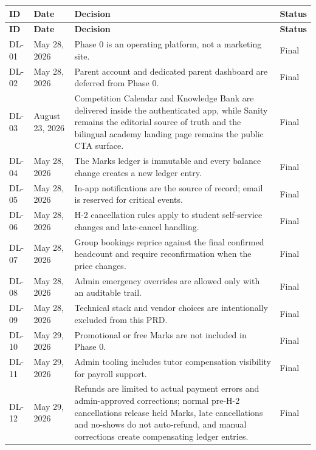\documentclass[11pt,a4paper]{article}
\begin{document}
\small
\begin{longtable}{|L{1.6cm}|L{2.1cm}|L{8.6cm}|L{2.1cm}|}
\hline
\textbf{ID} & \textbf{Date} & \textbf{Decision} & \textbf{Status} \\
\hline
\endfirsthead
\hline
\textbf{ID} & \textbf{Date} & \textbf{Decision} & \textbf{Status} \\
\hline
\endhead

DL-01 & May 28, 2026 & Phase 0 is an operating platform, not a marketing site. & Final \\
\hline
DL-02 & May 28, 2026 & Parent account and dedicated parent dashboard are deferred from Phase 0. & Final \\
\hline
DL-03 & August 23, 2026 & Competition Calendar and Knowledge Bank are delivered inside the authenticated app, while Sanity remains the editorial source of truth and the bilingual academy landing page remains the public CTA surface. & Final \\
\hline
DL-04 & May 28, 2026 & The Marks ledger is immutable and every balance change creates a new ledger entry. & Final \\
\hline
DL-05 & May 28, 2026 & In-app notifications are the source of record; email is reserved for critical events. & Final \\
\hline
DL-06 & May 28, 2026 & H-2 cancellation rules apply to student self-service changes and late-cancel handling. & Final \\
\hline
DL-07 & May 28, 2026 & Group bookings reprice against the final confirmed headcount and require reconfirmation when the price changes. & Final \\
\hline
DL-08 & May 28, 2026 & Admin emergency overrides are allowed only with an auditable trail. & Final \\
\hline
DL-09 & May 28, 2026 & Technical stack and vendor choices are intentionally excluded from this PRD. & Final \\
\hline
DL-10 & May 29, 2026 & Promotional or free Marks are not included in Phase 0. & Final \\
\hline
DL-11 & May 29, 2026 & Admin tooling includes tutor compensation visibility for payroll support. & Final \\
\hline
DL-12 & May 29, 2026 & Refunds are limited to actual payment errors and admin-approved corrections; normal pre-H-2 cancellations release held Marks, late cancellations and no-shows do not auto-refund, and manual corrections create compensating ledger entries. & Final \\
\hline

\end{longtable}
\end{document}
